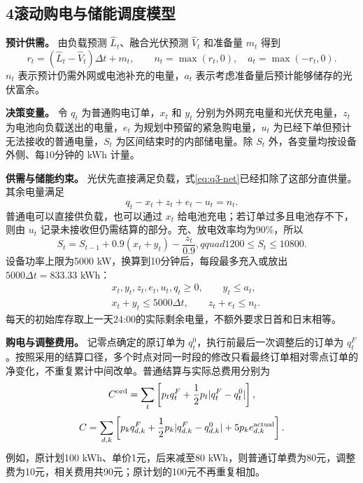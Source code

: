 \documentclass[11pt,a4paper]{article}
\begin{document}
\subsection*{4\quad 滚动购电与储能调度模型}

\textbf{预计供需。} 由负载预测 $\widehat L_t$、融合光伏预测 $\widehat V_t$ 和准备量 $m_t$ 得到
\begin{equation}
r_t=(\widehat L_t-\widehat V_t)\Delta t+m_t,\qquad
n_t=\max(r_t,0),\quad a_t=\max(-r_t,0).
\label{eq:q3-net}
\end{equation}
$n_t$ 表示预计仍需外网或电池补充的电量，$a_t$ 表示考虑准备量后预计能够储存的光伏富余。

\textbf{决策变量。} 令 $q_t$ 为普通购电订单，$x_t$ 和 $y_t$ 分别为外网充电量和光伏充电量，$z_t$ 为电池向负载送出的电量，$e_t$ 为规划中预留的紧急购电量，$u_t$ 为已经下单但预计无法接收的普通电量，$S_t$ 为区间结束时的内部储电量。除 $S_t$ 外，各变量均按设备外侧、每10分钟的 kWh 计量。

\textbf{供需与储能约束。} 光伏先直接满足负载，式\eqref{eq:q3-net}已经扣除了这部分直供量。其余电量满足
\begin{equation}
q_t-x_t+z_t+e_t-u_t=n_t.
\label{eq:q3-balance}
\end{equation}
普通电可以直接供负载，也可以通过 $x_t$ 给电池充电；若订单过多且电池存不下，则由 $u_t$ 记录未接收但仍需结算的部分。充、放电效率均为90\%，所以
\begin{equation}
S_t=S_{t-1}+0.9(x_t+y_t)-\frac{z_t}{0.9},qquad
1200\le S_t\le10800.
\label{eq:q3-storage}
\end{equation}
设备功率上限为5000 kW，换算到10分钟后，每段最多充入或放出 $5000\Delta t=833.33$ kWh：
\begin{equation}
\begin{aligned}
&x_t,y_t,z_t,e_t,u_t,q_t\ge0,\qquad y_t\le a_t,\\
&x_t+y_t\le5000\Delta t,\qquad z_t+e_t\le n_t.
\end{aligned}
\label{eq:q3-bounds}
\end{equation}
每天的初始库存取上一天24:00的实际剩余电量，不额外要求日首和日末相等。

\textbf{购电与调整费用。} 记零点确定的原订单为 $q_t^0$，执行前最后一次调整后的订单为 $q_t^F$。按照采用的结算口径，多个时点对同一时段的修改只看最终订单相对零点订单的净变化，不重复累计中间改单。普通结算与实际总费用分别为
\begin{equation}
C^{\rm ord}=\sum_t\left[p_tq_t^F+\frac12p_t|q_t^F-q_t^0|\right],
\label{eq:q3-ordinary}
\end{equation}
\begin{equation}
C=\sum_{d,k}\left[p_kq_{d,k}^F+\frac12p_k|q_{d,k}^F-q_{d,k}^0|
+5p_ke^{\rm actual}_{d,k}\right].
\label{eq:q3-bill}
\end{equation}
例如，原计划100 kWh、单价1元，后来减至80 kWh，则普通订单费为80元，调整费为10元，相关费用共90元；原计划的100元不再重复相加。
\end{document}
